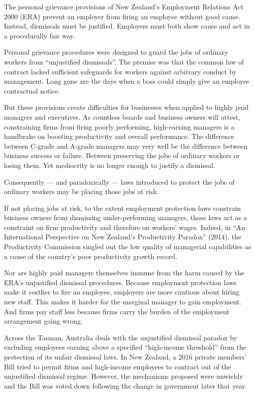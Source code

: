 The personal grievance provisions of New Zealand's Employment Relations Act 2000 (ERA) prevent an employer from firing an employee without good cause. Instead, dismissals must be justified. Employers must both show cause and act in a procedurally fair way.


Personal grievance procedures were designed to guard the jobs of ordinary workers from ``unjustified dismissals''. The premise was that the common law of contract lacked sufficient safeguards for workers against arbitrary conduct by management. Long gone are the days when a boss could simply give an employee contractual notice.


But these provisions create difficulties for businesses when applied to highly paid managers and executives. As countless boards and business owners will attest, constraining firms from firing poorly performing, high-earning managers is a handbrake on boosting productivity and overall performance. The difference between C-grade and A-grade managers may very well be the difference between business success or failure. Between preserving the jobs of ordinary workers or losing them. Yet mediocrity is no longer enough to justify a dismissal.


Consequently — and paradoxically — laws introduced to protect the jobs of ordinary workers may be placing those jobs at risk.


If not placing jobs at risk, to the extent employment protection laws constrain business owners from dismissing under-performing managers, those laws act as a constraint on firm productivity and therefore on workers' wages. Indeed, in ``An International Perspective on New Zealand's Productivity Paradox'' (2014), the Productivity Commission singled out the low quality of managerial capabilities as a cause of the country's poor productivity growth record.


Nor are highly paid managers themselves immune from the harm caused by the ERA's unjustified dismissal procedures. Because employment protection laws make it costlier to fire an employee, employers are more cautious about hiring new staff. This makes it harder for the marginal manager to gain employment. And firms pay staff less because firms carry the burden of the employment arrangement going wrong.


Across the Tasman, Australia deals with the unjustified dismissal paradox by excluding employees earning above a specified ``high-income threshold'' from the protection of its unfair dismissal laws. In New Zealand, a 2016 private members' Bill tried to permit firms and high-income employees to contract out of the unjustified dismissal regime. However, the mechanisms proposed were unwieldy and the Bill was voted down following the change in government later that year. 